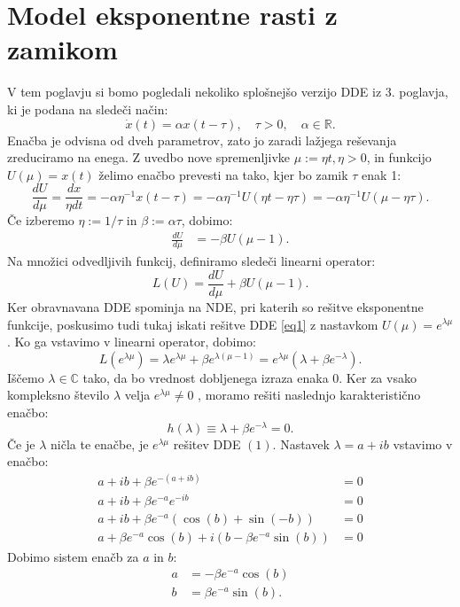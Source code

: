\documentclass[12pt,a4paper]{amsart}
\theoremstyle{definition} %
\theoremstyle{plain} %
\newcommand{\R}{\mathbb R}
\newcommand{\C}{\mathbb C}
\begin{document}
\section{Model eksponentne rasti z zamikom}

V tem poglavju si bomo pogledali nekoliko splošnejšo verzijo DDE iz 3. poglavja, ki je podana na sledeči način:
\[\dot{x}(t)= \alpha x(t-\tau), \quad \tau > 0,\quad \alpha \in \R.\]
Enačba je odvisna od dveh parametrov, zato jo zaradi lažjega reševanja zreduciramo na enega.
Z uvedbo nove spremenljivke $\mu:=\eta t, \eta > 0$, in funkcijo
$U(\mu)=x(t)$ želimo enačbo prevesti na tako, kjer bo zamik $\tau$ enak 1:
\[\frac{dU}{d\mu}=\frac{dx}{\eta dt}=-\alpha \eta^{-1}x(t-\tau)=-\alpha \eta^{-1}U(\eta t - \eta \tau)=
-\alpha \eta^{-1}U(\mu - \eta \tau).\]
Če izberemo $\eta := 1/\tau$ in $\beta:=\alpha \tau$, dobimo:
\begin{equation} \label{eq1}
    \begin{split}
 \frac{dU}{d\mu} & =-\beta U(\mu -1).
    \end{split}
\end{equation}
Na množici odvedljivih funkcij, definiramo sledeči linearni operator:
\[L(U)=\frac{dU}{d\mu} + \beta U(\mu -1).\]
Ker obravnavana DDE spominja na NDE, pri katerih so rešitve eksponentne funkcije, poskusimo tudi tukaj
iskati rešitve DDE \eqref{eq1} z nastavkom $U(\mu)=e^{\lambda \mu}$. Ko ga vstavimo v linearni operator,
dobimo:
\[L(e^{\lambda \mu})= \lambda e^{\lambda \mu} + \beta e^{\lambda (\mu -1)}=
e^{\lambda \mu}(\lambda + \beta e^{-\lambda}).\]
Iščemo $\lambda \in \C$ tako, da bo vrednost dobljenega izraza enaka 0. Ker
za vsako kompleksno število $\lambda$ velja $e^{\lambda \mu} \neq 0$ , moramo rešiti naslednjo karakteristično
enačbo:
\[ h(\lambda) \equiv \lambda + \beta e^{-\lambda} =0.\]
Če je $\lambda$ ničla te enačbe, je $e^{\lambda\mu}$ rešitev DDE $(1)$.
Nastavek $\lambda = a + ib$ vstavimo v enačbo:
\begin{equation*}
    \begin{split}
        a + ib + \beta e^{-(a+ib)} &= 0 \\
        a + ib + \beta e^{-a}e^{-ib} &= 0 \\
        a + ib + \beta e^{-a}(\cos(b) + \sin(-b)) &= 0 \\
        a + \beta e^{-a}\cos(b) + i(b-\beta e^{-a}\sin(b)) &= 0
    \end{split}      
\end{equation*}
Dobimo sistem enačb za $a$ in $b$:
\begin{equation*}
    \begin{split}
        a &= -\beta e^{-a}\cos(b) \\
        b &= \beta e^{-a}\sin(b).
    \end{split}      
\end{equation*}
\end{document}
